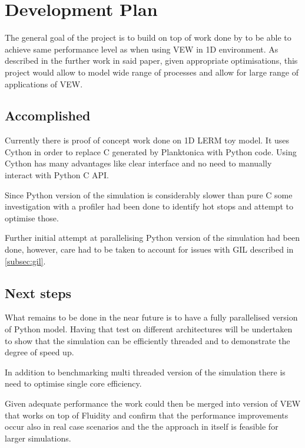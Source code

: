 \documentclass[12pt, a4paper]{report}
\begin{document}

\chapter{Development Plan}\label{ch:plan}

The general goal of the project is to build on top of work done by \cite{FluidityVEW}
to be able to achieve same performance level as when using VEW in 1D environment. As
described in the further work in said paper, given appropriate optimisations, this project
would allow to model wide range of processes and allow for large range of applications
of VEW.

\section{Accomplished}\label{sec:acc}

Currently there is proof of concept work done on 1D LERM toy model. It uses Cython
in order to replace C generated by Planktonica with Python code. Using Cython has
many advantages like clear interface and no need to manually interact with Python C API.

Since Python version of the simulation is considerably slower than pure C some investigation
with a profiler had been done to identify hot stops and attempt to optimise those.

Further initial attempt at parallelising Python version of the simulation had been done, however,
care had to be taken to account for issues with GIL described in \ref{subsec:gil}.

\section{Next steps}\label{sec:next}

What remains to be done in the near future is to have a fully parallelised version of Python model.
Having that test on different architectures will be undertaken to show that the simulation can be
efficiently threaded and to demonstrate the degree of speed up.

In addition to benchmarking multi threaded version of the simulation there is need to optimise
single core efficiency.

Given adequate performance the work could then be merged into version of VEW that works on top of Fluidity
and confirm that the performance improvements occur also in real case scenarios and the the approach in itself
is feasible for larger simulations.
\end{document}
